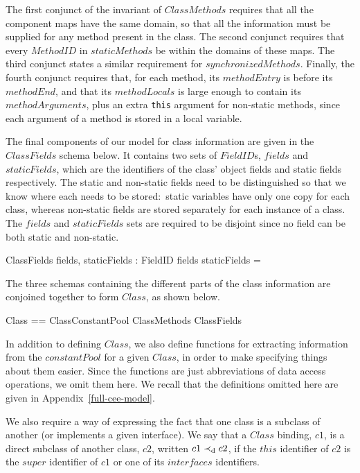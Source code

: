 The first conjunct of the invariant of $ClassMethods$ requires that
all the component maps have the same domain, so that all the
information must be supplied for any method present in the class.
The second conjunct requires that every $MethodID$ in $staticMethods$
be within the domains of these maps.
The third conjunct states a similar requirement for
$synchronizedMethods$.
Finally, the fourth conjunct requires that, for each method, its
$methodEntry$ is before its $methodEnd$, and that its $methodLocals$
is large enough to contain its $methodArguments$, plus an extra
\texttt{this} argument for non-static methods, since each argument of
a method is stored in a local variable.

The final components of our model for class information are given in
the $ClassFields$ schema below.
It contains two sets of $FieldID$s, $fields$ and $staticFields$, which
are the identifiers of the class' object fields and static fields
respectively.
The static and non-static fields need to be distinguished so that we
know where each needs to be stored:~static variables have only one
copy for each class, whereas non-static fields are stored separately
for each instance of a class.
The $fields$ and $staticFields$ sets are required to be disjoint since
no field can be both static and non-static.
\begin{schema}{ClassFields}
  fields, staticFields : \finset FieldID
\where
  fields \cap staticFields = \emptyset
\end{schema}

The three schemas containing the different parts of the class
information are conjoined together to form $Class$, as shown below.
\begin{zed}
  Class == ClassConstantPool \land ClassMethods \land ClassFields
\end{zed}

In addition to defining $Class$, we also define functions for
extracting information from the $constantPool$ for a given $Class$, in
order to make specifying things about them easier.
Since the functions are just abbreviations of data access operations,
we omit them here.
We recall that the definitions omitted here are given in
Appendix~\ref{full-cee-model}.

We also require a way of expressing the fact that one class is a
subclass of another (or implements a given interface).
We say that a $Class$ binding, $c1$, is a direct subclass of another
class, $c2$, written $c1 \prec_{\mathrm{d}} c2$, if the $this$ identifier
of $c2$ is the $super$ identifier of $c1$ or one of its $interfaces$
identifiers.

